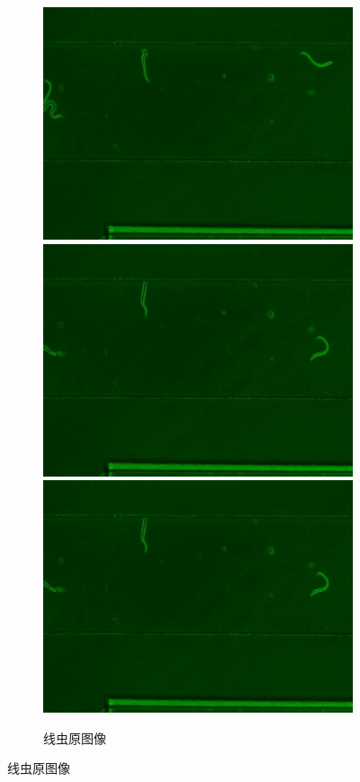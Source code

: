 \begin{figure}[!htp]
	  \centering

	  \begin{subfigure}{\linewidth}
		\centering
		\begin{minipage}[b]{\linewidth}
		\includegraphics[width=0.33\linewidth,natwidth=800,natheight=600]{figure/chap3/img/441.orgin.851.jpg}
		\includegraphics[width=0.33\linewidth,natwidth=800,natheight=600]{figure/chap3/img/441.orgin.1051.jpg}
		\includegraphics[width=0.33\linewidth,natwidth=800,natheight=600]{figure/chap3/img/441.orgin.1051.jpg}
		\end{minipage}
		\caption{线虫原图像}
	  \end{subfigure}


\end{figure}
